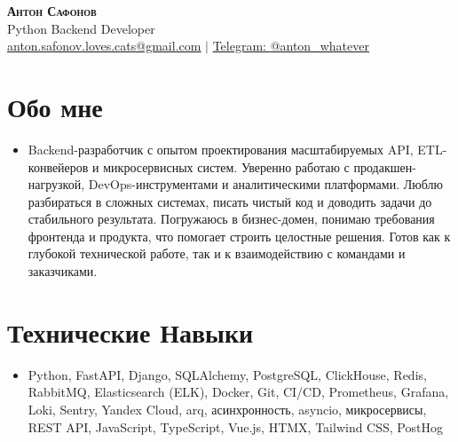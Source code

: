 \documentclass[letterpaper,11pt]{article}
\begin{document}
\vspace*{-50pt}

\begin{center}
    \textbf{\huge \scshape Антон Сафонов} \\ \vspace{-1pt}
    \large Python Backend Developer \\ \vspace{-1pt}
    \small \href{mailto:anton.safonov.loves.cats@gmail.com}{\underline{anton.safonov.loves.cats@gmail.com}} $|$ 
    \href{https://t.me/anton_whatever}{Telegram: \underline{@anton\_whatever}} 
\end{center}

\section{Обо мне}
\small\begin{itemize}[leftmargin=0.15in, label={}]
\item{Backend-разработчик с опытом проектирования масштабируемых API, ETL-конвейеров и микросервисных систем. Уверенно работаю с продакшен-нагрузкой, DevOps-инструментами и аналитическими платформами. Люблю разбираться в сложных системах, писать чистый код и доводить задачи до стабильного результата. Погружаюсь в бизнес-домен, понимаю требования фронтенда и продукта, что помогает строить целостные решения. Готов как к глубокой технической работе, так и к взаимодействию с командами и заказчиками.}
\end{itemize}
\section{Технические Навыки}
 \begin{itemize}[leftmargin=0.15in, label={}]
    \item Python, FastAPI, Django, SQLAlchemy, PostgreSQL, ClickHouse, Redis,  RabbitMQ, Elasticsearch (ELK), Docker, Git, CI/CD, Prometheus, Grafana, Loki, Sentry, Yandex Cloud, arq, асинхронность, asyncio, микросервисы, REST API, JavaScript, TypeScript, Vue.js, HTMX, Tailwind CSS, PostHog
 \end{itemize}
\end{document}
